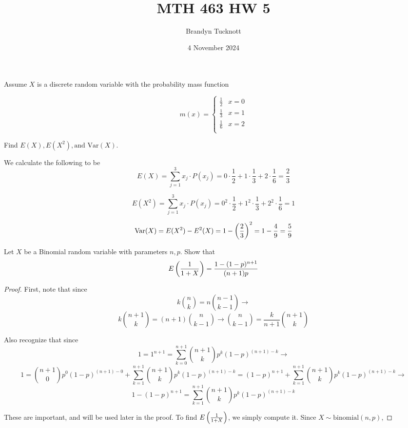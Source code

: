 \documentclass{exam}
\title{MTH 463 HW 5}
\author{Brandyn Tucknott}
\date{4 November 2024}
\begin{document}
\maketitle

\begin{questions}
    \question
Assume $X$ is a discrete random variable with the probability mass function

$$m(x) =
\begin{cases}
    \frac{1}{2} & x = 0 \\
    \frac{1}{3} & x = 1 \\
    \frac{1}{6} & x = 2 \\
\end{cases}$$

Find $E(X), E(X^2), \text{and Var}(X)$.

\sol
We calculate the following to be
$$E(X) = \sum_{j = 1}^3 x_j \cdot P(x_j) = 0 \cdot \frac{1}{2} + 1 \cdot \frac{1}{3} + 2 \cdot \frac{1}{6} = \frac{2}{3}$$

$$E(X^2) = \sum_{j = 1}^3 x_j \cdot P(x_j) = 0^2 \cdot \frac{1}{2} + 1^2 \cdot \frac{1}{3} + 2^2 \cdot \frac{1}{6} = 1$$

$$\text{Var}(X) = E(X^2) - E^2(X) = 1 - \left( \frac{2}{3} \right)^2 = 1 - \frac{4}{9} = \frac{5}{9}$$


\newpage
\question
Let $X$ be a Binomial random variable with parameters $n, p$. Show that
$$E\left( \frac{1}{1 + X} \right) = \frac{1 - (1 - p)^{n + 1}}{(n + 1)p}$$

\begin{proof}
    First, note that since
    $$k \binom{n}{k} = n \binom{n - 1}{k - 1} \longrightarrow$$
    \begin{equation}
        k\binom{n + 1}{k} = (n + 1)\binom{n}{k - 1} \rightarrow
        \binom{n}{k - 1} = \frac{k}{n + 1} \binom{n + 1}{k}
    \end{equation}

    Also recognize that since
    $$1 = 1^{n + 1} = \sum_{k = 0}^{n + 1} \binom{n + 1}{k}p^k(1 - p)^{(n + 1) - k} \longrightarrow$$
    $$1 = \binom{n + 1}{0}p^0(1 - p)^{(n + 1) - 0} + \sum_{k = 1}^{n + 1} \binom{n + 1}{k}p^k(1 - p)^{(n + 1) - k}  = (1 - p)^{n + 1} + \sum_{k = 1}^{n + 1} \binom{n + 1}{k}p^k(1 - p)^{(n + 1) - k}\longrightarrow$$
    \begin{equation}
        1 - (1 - p)^{n + 1} = \sum_{k = 1}^{n + 1} \binom{n + 1}{k}p^k(1 - p)^{(n + 1) - k}
    \end{equation}
    
    
    These are important, and will be used later in the proof. To find $E\left( \frac{1}{1 + X} \right)$, we simply compute it. Since $X \sim \text{binomial}(n, p)$,


\end{proof}
\end{questions}
\end{document}

